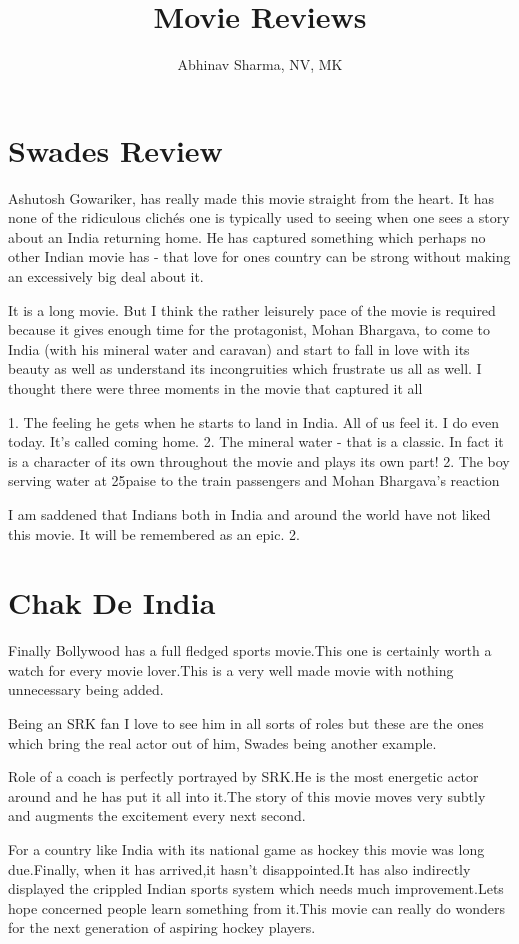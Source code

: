 \documentclass[]{article}
\title{Movie Reviews}
\author{Abhinav Sharma, NV, MK}
\date
\begin{document}
\maketitle
\section{Swades Review}
Ashutosh Gowariker, has really made this movie straight from the heart. It has none of the ridiculous clichés one is typically used to seeing when one sees a story about an India returning home. He has captured something which perhaps no other Indian movie has - that love for ones country can be strong without making an excessively big deal about it.

It is a long movie. But I think the rather leisurely pace of the movie is required because it gives enough time for the protagonist, Mohan Bhargava, to come to India (with his mineral water and caravan) and start to fall in love with its beauty as well as understand its incongruities which frustrate us all as well. I thought there were three moments in the movie that captured it all

1. The feeling he gets when he starts to land in India. All of us feel it. I do even today. It's called coming home. 2. The mineral water - that is a classic. In fact it is a character of its own throughout the movie and plays its own part! 2. The boy serving water at 25paise to the train passengers and Mohan Bhargava's reaction

I am saddened that Indians both in India and around the world have not liked this movie. It will be remembered as an epic. 2.

\section{Chak De India}
Finally Bollywood has a full fledged sports movie.This one is certainly worth a watch for every movie lover.This is a very well made movie with nothing unnecessary being added.


Being an SRK fan I love to see him in all sorts of roles but these are the ones which bring the real actor out of him, Swades being another example.

Role of a coach is perfectly portrayed by SRK.He is the most energetic actor around and he has put it all into it.The story of this movie moves very subtly and augments the excitement every next second.

For a country like India with its national game as hockey this movie was long due.Finally, when it has arrived,it hasn't disappointed.It has also indirectly displayed the crippled Indian sports system which needs much improvement.Lets hope concerned people learn something from it.This movie can really do wonders for the next generation of aspiring hockey players.
\end{document}
